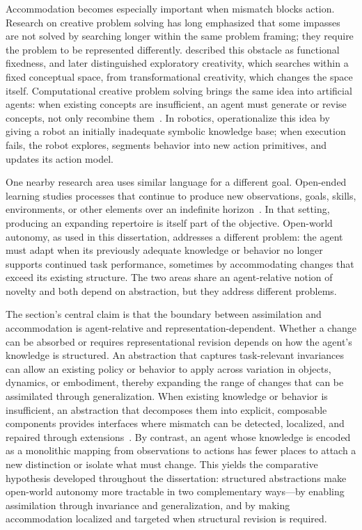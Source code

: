 Accommodation becomes especially important when mismatch blocks action.
Research on creative problem solving has long emphasized that some impasses are not solved by searching longer within the same problem framing; they require the problem to be represented differently.
\citet{duncker1945problem} described this obstacle as functional fixedness, and \citet{boden2004creative} later distinguished exploratory creativity, which searches within a fixed conceptual space, from transformational creativity, which changes the space itself.
Computational creative problem solving brings the same idea into artificial agents: when existing concepts are insufficient, an agent must generate or revise concepts, not only recombine them~\citep{gizzi2022cps}.
In robotics, \citet{gizzi2019creative} operationalize this idea by giving a robot an initially inadequate symbolic knowledge base; when execution fails, the robot explores, segments behavior into new action primitives, and updates its action model.

One nearby research area uses similar language for a different goal.
Open-ended learning studies processes that continue to produce new observations, goals, skills, environments, or other elements over an indefinite horizon~\citep{sigaud2023openended}.
In that setting, producing an expanding repertoire is itself part of the objective.
Open-world autonomy, as used in this dissertation, addresses a different problem: the agent must adapt when its previously adequate knowledge or behavior no longer supports continued task performance, sometimes by accommodating changes that exceed its existing structure.
The two areas share an agent-relative notion of novelty and both depend on abstraction, but they address different problems.
\label{sec:openworld_vs_openended}

The section's central claim is that the boundary between assimilation and accommodation is agent-relative and representation-dependent.
Whether a change can be absorbed or requires representational revision depends on how the agent's knowledge is structured.
An abstraction that captures task-relevant invariances can allow an existing policy or behavior to apply across variation in objects, dynamics, or embodiment, thereby expanding the range of changes that can be assimilated through generalization.
When existing knowledge or behavior is insufficient, an abstraction that decomposes them into explicit, composable components provides interfaces where mismatch can be detected, localized, and repaired through extensions~\cite{sarathy2021spotter}.
By contrast, an agent whose knowledge is encoded as a monolithic mapping from observations to actions has fewer places to attach a new distinction or isolate what must change.
This yields the comparative hypothesis developed throughout the dissertation: structured abstractions make open-world autonomy more tractable in two complementary ways---by enabling assimilation through invariance and generalization, and by making accommodation localized and targeted when structural revision is required.
